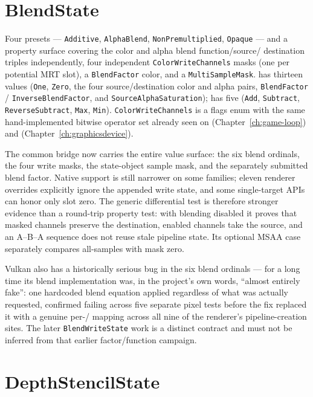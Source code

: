 \section{BlendState}

Four presets --- \texttt{Additive}, \texttt{AlphaBlend}, \texttt{NonPremultiplied},
\texttt{Opaque} --- and a property surface covering the color and alpha blend function/source/%
destination triples independently, four independent \texttt{ColorWriteChannels} masks (one
per potential MRT slot), a \texttt{BlendFactor} color, and a \texttt{MultiSampleMask}.
 has thirteen values (\texttt{One}, \texttt{Zero}, the four
source/destination color and alpha pairs, \texttt{BlendFactor} / \texttt{InverseBlendFactor},
and \texttt{SourceAlphaSaturation});  has five (\texttt{Add},
\texttt{Subtract}, \texttt{ReverseSubtract}, \texttt{Max}, \texttt{Min}).
\texttt{ColorWriteChannels} is a flags enum with the same hand-implemented bitwise operator
set already seen on  (Chapter~\ref{ch:game-loop}) and
 (Chapter~\ref{ch:graphicsdevice}).

The common bridge now carries the entire value surface: the six blend ordinals, the four write
masks, the state-object sample mask, and the separately submitted blend factor. Native support is
still narrower on some families; eleven renderer overrides explicitly ignore the appended write
state, and some single-target APIs can honor only slot zero. The generic differential test is
therefore stronger evidence than a round-trip property test: with blending disabled it proves
that masked channels preserve the destination, enabled channels take the source, and an A--B--A
sequence does not reuse stale pipeline state. Its optional MSAA case separately compares
all-samples with mask zero.

Vulkan also has a historically serious bug in the six blend ordinals --- for a long time its
blend implementation was, in the project's own words, ``almost entirely fake'': one hardcoded
blend equation applied regardless of what was actually requested, confirmed failing across five
separate pixel tests before the fix replaced it with a genuine per-/%
 mapping across all nine of the renderer's pipeline-creation sites. The
later \texttt{BlendWriteState} work is a distinct contract and must not be inferred from that
earlier factor/function campaign.

\section{DepthStencilState}

